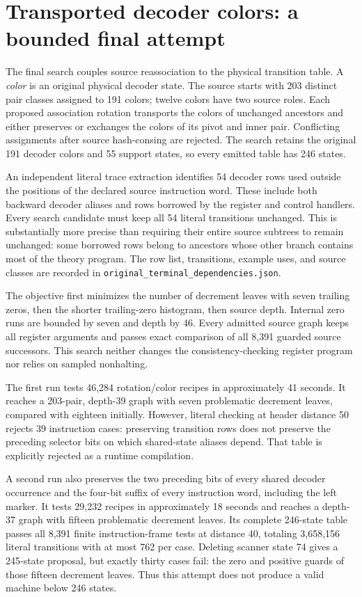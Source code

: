 \section{Transported decoder colors: a bounded final attempt}
The final search couples source reassociation to the physical transition
table. A \emph{color} is an original physical decoder state. The source
starts with 203 distinct pair classes assigned to 191 colors; twelve colors
have two source roles. Each proposed association rotation transports the
colors of unchanged ancestors and either preserves or exchanges the colors
of its pivot and inner pair. Conflicting assignments after source
hash-consing are rejected. The search retains the original 191 decoder
colors and 55 support states, so every emitted table has 246 states.

An independent literal trace extraction identifies 54 decoder rows used
outside the positions of the declared source instruction word. These include
both backward decoder aliases and rows borrowed by the register and control
handlers. Every search candidate must keep all 54 literal transitions
unchanged. This is substantially more precise than requiring their entire
source subtrees to remain unchanged: some borrowed rows belong to ancestors
whose other branch contains most of the theory program. The row list,
transitions, example uses, and source classes are recorded in
\texttt{original\_terminal\_dependencies.json}.

The objective first minimizes the number of decrement leaves with seven
trailing zeros, then the shorter trailing-zero histogram, then source depth.
Internal zero runs are bounded by seven and depth by 46. Every admitted
source graph keeps all register arguments and passes exact comparison of
all 8,391 guarded source successors. This search neither changes the
consistency-checking register program nor relies on sampled nonhalting.

The first run tests 46,284 rotation/color recipes in approximately 41 seconds.
It reaches a 203-pair, depth-39 graph with seven problematic decrement leaves,
compared with eighteen initially. However, literal checking at header
distance 50 rejects 39 instruction cases: preserving transition rows does
not preserve the preceding selector bits on which shared-state aliases
depend. That table is explicitly rejected as a runtime compilation.

A second run also preserves the two preceding bits of every shared decoder
occurrence and the four-bit suffix of every instruction word, including the
left marker. It tests 29,232 recipes in approximately 18 seconds and reaches
a depth-37 graph with fifteen problematic decrement leaves. Its complete
246-state table passes all 8,391 finite instruction-frame tests at distance
40, totaling 3,658,156 literal transitions with at most 762 per case. Deleting
scanner state 74 gives a 245-state proposal, but exactly thirty cases fail:
the zero and positive guards of those fifteen decrement leaves. Thus this
attempt does not produce a valid machine below 246 states.

